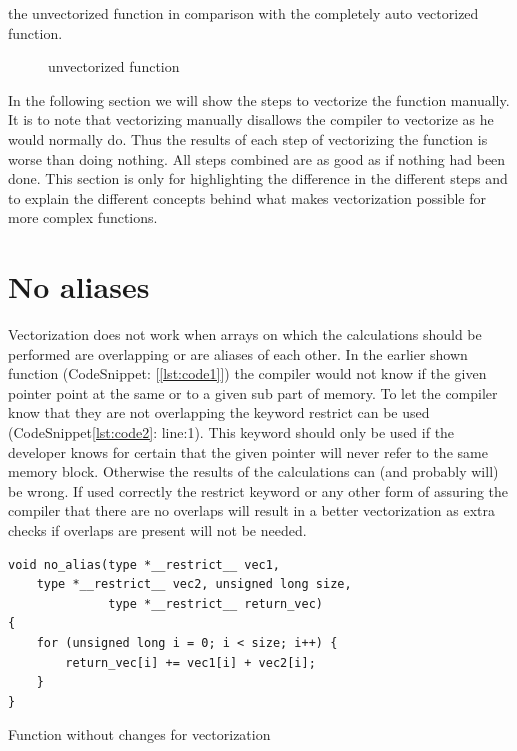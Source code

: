 \documentclass[
	12pt,
	a4paper,
	BCOR10mm,
	DIV14,
	headsepline,
	usegeometry,
]{scrreprt}
\begin{document}
the unvectorized function in comparison with the completely auto vectorized function. 
\begin{figure}[ht]
    \caption{unvectorized function}
    \label{fig:graphNorVecnor}
\end{figure}
In the following section we will show the steps to vectorize the function manually. It is to note
that vectorizing manually disallows the compiler to vectorize as he would normally do. Thus the
results of each step of vectorizing the function is worse than doing nothing. All steps combined
are as good as if nothing had been done. This section is only for highlighting the difference in
the different steps and to explain the different concepts behind what makes vectorization possible
for more complex functions.



\section{No aliases}
Vectorization does not work when arrays on which the calculations should be performed are
overlapping or are aliases of each other. In the earlier shown function (CodeSnippet:
[\ref{lst:code1}]) the compiler would not know if the given pointer point at the same or to
a given sub part of memory. To let the compiler know that they are not overlapping the keyword
restrict can be used (CodeSnippet\ref{lst:code2}: line:1). This keyword should only be used if the
developer knows for certain that the given pointer will never refer to the same memory block.
Otherwise the results of the calculations can (and probably will) be wrong. If used correctly the
restrict keyword or any other form of assuring the compiler that there are no overlaps will result
in a better vectorization as extra checks if overlaps are present will not be needed.
\begin{listing}
\begin{verbatim}
void no_alias(type *__restrict__ vec1,
    type *__restrict__ vec2, unsigned long size,
              type *__restrict__ return_vec)
{
    for (unsigned long i = 0; i < size; i++) {
        return_vec[i] += vec1[i] + vec2[i];
    }
}
\end{verbatim}
\caption{Function without changes for vectorization}
\label{lst:code2}
\end{listing}
\end{document}
